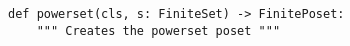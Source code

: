 \begin{verbatim}
def powerset(cls, s: FiniteSet) -> FinitePoset:
    """ Creates the powerset poset """
\end{verbatim}